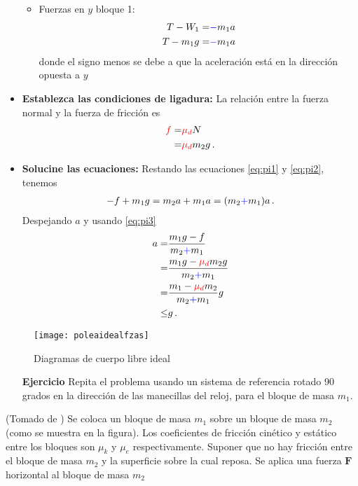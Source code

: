 \begin{frame}
\begin{itemize}
\begin{itemize}
  \item Fuerzas en $y$ bloque 1:
  \begin{align}
    \label{eq:pi2}
    T-W_1=&{\color{blue}-}m_1 a\nonumber\\
    T-m_1 g=&{\color{blue}-}m_1 a
  \end{align}
   donde el signo menos se debe a que la aceleración está en la dirección opuesta a $y$
  \end{itemize}
\item \textbf{Establezca las condiciones de ligadura:} La relación entre la fuerza normal y la fuerza de fricción es
  \begin{align}
    \label{eq:pi3}
    {\color{red}f}=&{\color{red}\mu_d} N\nonumber\\
    =&{\color{red}\mu_d} m_2 g\,.
  \end{align}
\item \textbf{Solucine las ecuaciones:} Restando las ecuaciones \eqref{eq:pi1} y \eqref{eq:pi2}, tenemos
  \begin{align*}
    -f+m_1 g=m_2 a+m_1 a=(m_2{\color{blue}+}m_1)a\,.
  \end{align*}
Despejando $a$ y usando \eqref{eq:pi3}
\begin{align}
  \label{eq:polea}
  a=&\frac{m_1g-f}{m_2{\color{blue}+}m_1}\nonumber\\
  =&\frac{m_1g-{\color{red}\mu_d} m_2 g}{m_2{\color{blue}+}m_1}\nonumber\\
  =&\frac{m_1-{\color{red}\mu_d} m_2 }{m_2{\color{blue}+}m_1}g\\
  \le&g\nonumber\,.
\end{align}
\finejemplo
\end{itemize}


\begin{figure}
    \centering
    \texttt{[image: poleaidealfzas]}
    \caption{Diagramas de cuerpo libre ideal}
    \label{fig:poleaidealfzas}
  \end{figure}
\end{frame}
  \begin{itemize}
  \item[\textbf{Ejercicio}] Repita el problema usando un sistema de referencia rotado 90 grados en la dirección de las manecillas del reloj, para el bloque de masa $m_1$.
  \end{itemize}

\ejercicio{}

(Tomado de \cite{gabriel}) Se coloca un bloque de masa $m_1$ sobre un bloque de masa $m_2$ (como se muestra en la figura). Los coeficientes de fricción cinético y estático entre los bloques son $\mu_k$ y $\mu_e$ respectivamente. Suponer que no hay fricción entre el bloque de masa $m_2$ y la superficie sobre la cual reposa. Se aplica una fuerza $\mathbf{F}$ horizontal al bloque de masa $m_2$

